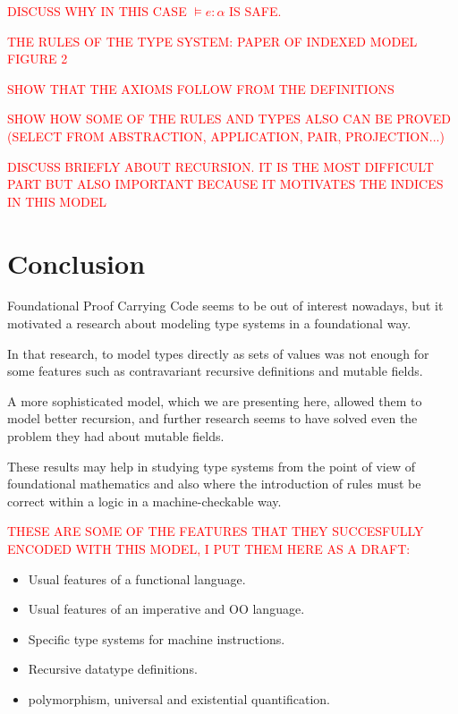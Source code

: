 \documentclass{article}
\begin{document}
\textcolor{red}{
  DISCUSS WHY IN THIS CASE $\models e : \alpha$ IS SAFE.
}

\textcolor{red}{
  THE RULES OF THE TYPE SYSTEM: PAPER OF INDEXED MODEL FIGURE 2
}

\textcolor{red}{
  SHOW THAT THE AXIOMS FOLLOW FROM THE DEFINITIONS
}

\textcolor{red}{
  SHOW HOW SOME OF THE RULES AND TYPES ALSO CAN BE PROVED 
  (SELECT FROM ABSTRACTION, APPLICATION, PAIR, PROJECTION...)
}

\textcolor{red}{
  DISCUSS BRIEFLY ABOUT RECURSION. IT IS THE MOST DIFFICULT PART 
  BUT ALSO IMPORTANT BECAUSE IT MOTIVATES THE INDICES IN THIS MODEL
}

\section*{Conclusion}

Foundational Proof Carrying Code seems to be out of interest 
nowadays, but it motivated a research about modeling type systems 
in a foundational way.

In that research, to model types directly as sets of values was
not enough for some features such as contravariant recursive
definitions and mutable fields.

A more sophisticated model, which we are presenting here, allowed 
them to model better recursion, and further research seems to have 
solved even the problem they had about mutable fields.

These results may help in studying type systems from the point of 
view of foundational mathematics and also where the introduction 
of rules must be correct within a logic in a machine-checkable 
way.

\textcolor{red}{
  THESE ARE SOME OF THE FEATURES THAT THEY SUCCESFULLY 
  ENCODED WITH THIS MODEL, I PUT THEM HERE AS A DRAFT:
}

\begin{itemize}
  \item Usual features of a functional language.
  \item Usual features of an imperative and OO language.
  \item Specific type systems for machine instructions.
  \item Recursive datatype definitions.
  \item polymorphism, universal and existential quantification.
\end{itemize}

{}

\end{document}
